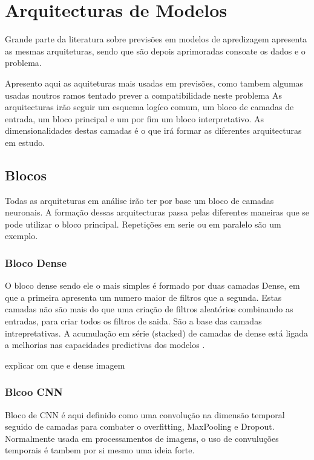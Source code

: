 \chapter{Arquitecturas de Modelos}

Grande parte da literatura sobre previsões em modelos de apredizagem apresenta as mesmas arquiteturas, sendo que são depois aprimoradas consoate os dados e o problema.

Apresento aqui as aquiteturas mais usadas em previsões, como tambem algumas usadas noutros ramos tentado prever a compatibilidade neste problema 
As arquitecturas irão seguir um esquema logíco comum, um bloco de camadas de entrada, um bloco principal e um por fim um bloco interpretativo.
As dimensionalidades destas camadas é o que irá formar as diferentes arquitecturas em estudo.

\section{Blocos  \label{se:blocos}}

Todas as arquiteturas em análise irão ter por base um bloco de camadas neuronais. A formação dessas arquitecturas passa pelas diferentes maneiras que se pode utilizar o bloco principal. Repetições em serie ou em paralelo são um exemplo.

\subsection{Bloco Dense}

O bloco dense sendo ele o mais simples é formado por duas camadas Dense, em que a primeira apresenta um numero maior de filtros que a segunda.
Estas camadas não são mais do que uma criação de filtros aleatórios combinando as entradas, para criar todos os filtros de saida. São a base das camadas intrepretativas. A acumulação em série (stacked) de camadas de dense está ligada a melhorias nas capacidades predictivas dos modelos \cite{VLHelen2021}.

explicar om que e dense
imagem

	
\subsection{Blcoo CNN}

Bloco de CNN é aqui definido como uma convolução na dimensão temporal seguido de camadas para combater o overfitting, MaxPooling e Dropout.
Normalmente usada em processamentos de imagens, o uso de convuluções temporais é tambem por si mesmo uma ideia forte.

